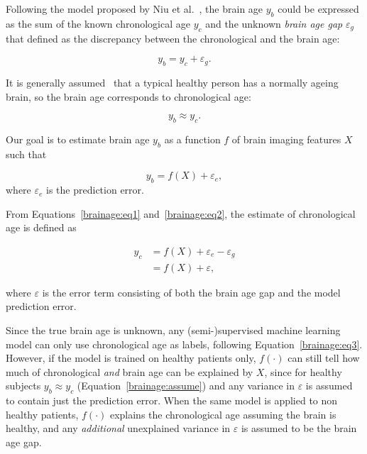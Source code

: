 Following the model proposed by Niu et al.~\cite{niu2019improved}, the brain age $y_b$ could be expressed as the sum of the known chronological age $y_c$ and the unknown \textit{brain age gap} $\varepsilon_g$ that defined as the discrepancy between the chronological and the brain age:

\begin{equation}
    \label{brainage:eq1}
    y_b = y_c + \varepsilon_g.
\end{equation}

It is generally assumed~\cite{franke2019ten} that a typical healthy person has a normally ageing brain, so the brain age corresponds to chronological age:

\begin{equation}
    \label{brainage:assume}
    y_b \approx y_c.
\end{equation}

Our goal is to estimate brain age $y_b$ as a function $f$ of brain imaging features $X$ such that

\begin{equation}
    \label{brainage:eq2}
    y_b = f(X) + \varepsilon_e,
\end{equation}
where $\varepsilon_e$ is the prediction error.

From Equations~\eqref{brainage:eq1} and~\eqref{brainage:eq2}, the estimate of chronological age is defined as

\begin{align}
    y_c &= f(X) + \varepsilon_e - \varepsilon_g \\
        \label{brainage:eq3}
        &= f(X) + \varepsilon,
\end{align}

where $\varepsilon$ is the error term consisting of both the brain age gap and the model prediction error.

Since the true brain age is unknown, any (semi-)supervised machine learning model can only use chronological age as labels, following Equation~\eqref{brainage:eq3}. However, if the model is trained on healthy patients only, $f(\cdot)$ can still tell how much of chronological \textit{and} brain age can be explained by $X$, since for healthy subjects $y_b \approx y_c$ (Equation~\eqref{brainage:assume}) and any variance in $\varepsilon$ is assumed to contain just the prediction error. When the same model is applied to non healthy patients, $f(\cdot)$ explains the chronological age assuming the brain is healthy, and any \textit{additional} unexplained variance in $\varepsilon$ is assumed to be the brain age gap.

